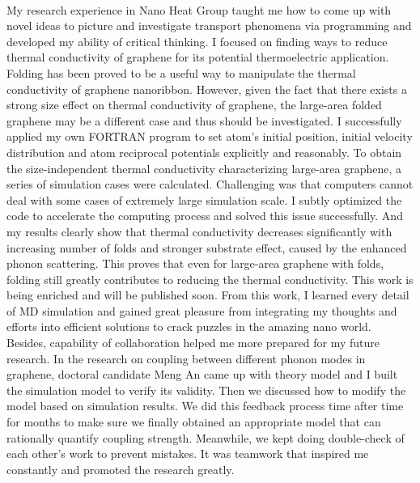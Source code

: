 \documentclass[a4paper,10pt]{article}
\begin{document}
\begin{spacing}{1.5}
\\
My research experience in Nano Heat Group taught me how to come up with novel ideas to picture and investigate transport phenomena via programming and developed my ability of critical thinking. I focused on finding ways to reduce thermal conductivity of graphene for its potential thermoelectric application. Folding has been proved to be a useful way to manipulate the thermal conductivity of graphene nanoribbon. However, given the fact that there exists a strong size effect on thermal conductivity of graphene, the large-area folded graphene may be a different case and thus should be investigated. I successfully applied my own FORTRAN program to set atom’s initial position, initial velocity distribution and atom reciprocal potentials explicitly and reasonably. To obtain the size-independent thermal conductivity characterizing large-area graphene, a series of simulation cases were calculated. Challenging was that computers cannot deal with some cases of extremely large simulation scale. I subtly optimized the code to accelerate the computing process and solved this issue successfully. And my results clearly show that thermal conductivity decreases significantly with increasing number of folds and stronger substrate effect, caused by the enhanced phonon scattering. This proves that even for large-area graphene with folds, folding still greatly contributes to reducing the thermal conductivity. This work is being enriched and will be published soon. From this work, I learned every detail of MD simulation and gained great pleasure from integrating my thoughts and efforts into efficient solutions to crack puzzles in the amazing nano world.\\
Besides, capability of collaboration helped me more prepared for my future research. In the research on coupling between different phonon modes in graphene, doctoral candidate Meng An came up with theory model and I built the simulation model to verify its validity. Then we discussed how to modify the model based on simulation results. We did this feedback process time after time for months to make sure we finally obtained an appropriate model that can rationally quantify coupling strength. Meanwhile, we kept doing double-check of each other’s work to prevent mistakes. It was teamwork that inspired me constantly and promoted the research greatly.\\
\\

\end{spacing}
\end{document}
